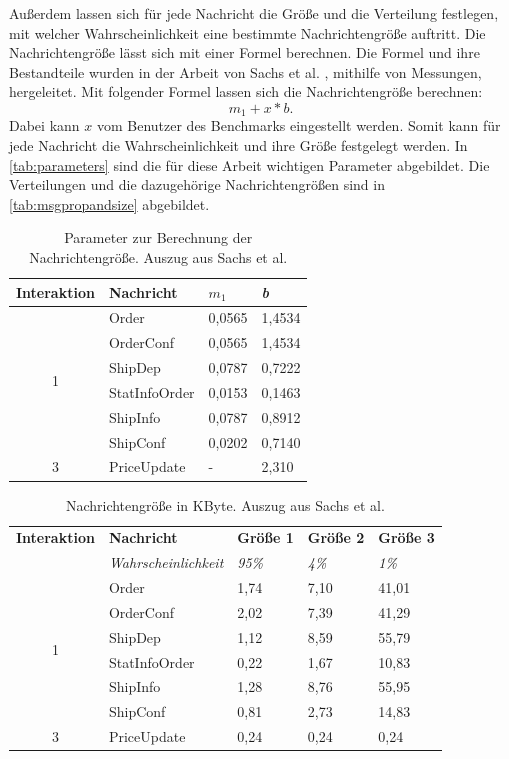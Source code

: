 Außerdem lassen sich für jede Nachricht die Größe und die Verteilung festlegen, mit welcher Wahrscheinlichkeit eine bestimmte Nachrichtengröße auftritt. Die Nachrichtengröße lässt sich mit einer Formel berechnen. Die Formel und ihre Bestandteile wurden in der Arbeit von Sachs et al. \cite{Sachs2013}, mithilfe von Messungen, hergeleitet. Mit folgender Formel lassen sich die Nachrichtengröße berechnen: 
\[m_1 + x * b .\] 
Dabei kann $x$ vom Benutzer des Benchmarks eingestellt werden. Somit kann für jede Nachricht die Wahrscheinlichkeit und ihre Größe festgelegt werden. In \autoref{tab:parameters} sind die für diese Arbeit wichtigen Parameter abgebildet. Die Verteilungen und die dazugehörige Nachrichtengrößen sind in \autoref{tab:msgpropandsize} abgebildet.


\begin{table}
\center
  \begin{tabular}{|c|l|l|l|}
  \hline
    \textbf{Interaktion} & \textbf{Nachricht} & \textit{\(m_1\)} & \textit{b}  \\
    \hline \hline
    \multirow{6}{*}{1} & Order & 0,0565 & 1,4534 \\\cline{2-4}
    & OrderConf & 0,0565 & 1,4534 \\\cline{2-4}
    & ShipDep & 0,0787 & 0,7222 \\\cline{2-4}
    & StatInfoOrder & 0,0153 & 0,1463 \\\cline{2-4}
    & ShipInfo & 0,0787 & 0,8912 \\\cline{2-4}
    & ShipConf & 0,0202 & 0,7140  \\\hline
    \hline
     3 & PriceUpdate & - & 2,310 \\\hline
  \end{tabular}
	\caption{\label{tab:parameters} Parameter zur Berechnung der Nachrichtengröße. Auszug aus Sachs et al. \cite{Sachs2013}}
\end{table}

\begin{table}
\center
  \begin{tabular}{|c|l|l|l|l|}
  \hline
    \textbf{Interaktion} & \textbf{Nachricht} & \textbf{Größe 1} & \textbf{Größe 2} &\textbf{Größe 3} \\
     & \textit{Wahrscheinlichkeit} & \textit{95\%}  & \textit{4\%} &\textit{1\%}   \\
    \hline \hline
    \multirow{6}{*}{1} & Order & 1,74 & 7,10 & 41,01 \\\cline{2-5}
    & OrderConf & 2,02 & 7,39 & 41,29 \\\cline{2-5}
    & ShipDep & 1,12 & 8,59 & 55,79\\\cline{2-5}
    & StatInfoOrder & 0,22 & 1,67 & 10,83 \\\cline{2-5}
    & ShipInfo & 1,28 & 8,76 & 55,95 \\\cline{2-5}
    & ShipConf & 0,81 & 2,73 & 14,83  \\\hline
    \hline
     3 & PriceUpdate & 0,24 & 0,24 & 0,24 \\\hline
  \end{tabular}
	\caption{\label{tab:msgpropandsize} Nachrichtengröße in KByte. Auszug aus Sachs et al.\cite{Sachs2013}}
\end{table}

